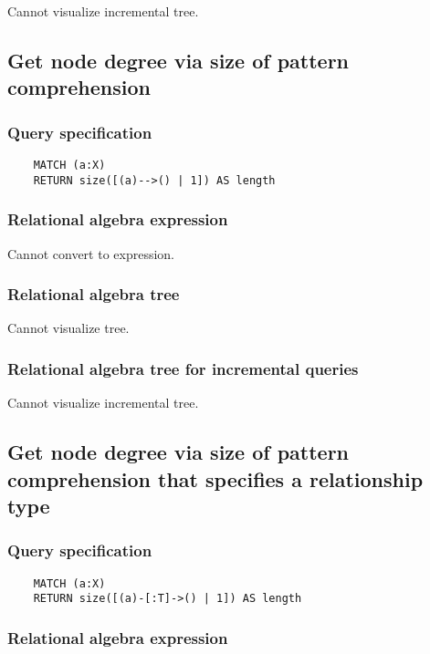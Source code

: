 	Cannot visualize incremental tree.
	\subsection{Get node degree via size of pattern comprehension}

	\subsubsection*{Query specification}

	\begin{lstlisting}
	MATCH (a:X)
	RETURN size([(a)-->() | 1]) AS length
	\end{lstlisting}


	\subsubsection*{Relational algebra expression}

	Cannot convert to expression.

	\subsubsection*{Relational algebra tree}

	Cannot visualize tree.

	\subsubsection*{Relational algebra tree for incremental queries}

	Cannot visualize incremental tree.
	\subsection{Get node degree via size of pattern comprehension that specifies a relationship type}

	\subsubsection*{Query specification}

	\begin{lstlisting}
	MATCH (a:X)
	RETURN size([(a)-[:T]->() | 1]) AS length
	\end{lstlisting}


	\subsubsection*{Relational algebra expression}

